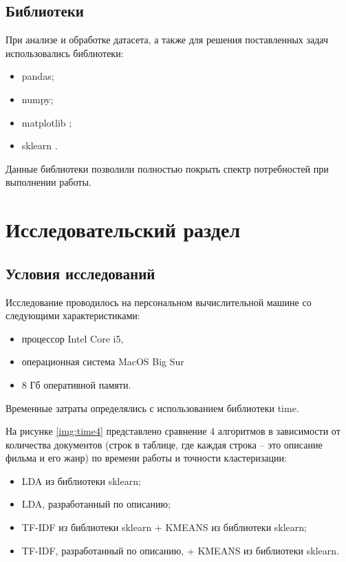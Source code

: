 \documentclass[12pt]{report}
\begin{document}
\section{Библиотеки}

При анализе и обработке датасета, а также для решения поставленных задач использовались библиотеки:
\begin{itemize}
	\item pandas;
	\item numpy;
	\item matplotlib \cite{matplotlib};
	\item sklearn \cite{sklearn}.
\end{itemize}

Данные библиотеки позволили полностью покрыть спектр потребностей при выполнении работы.


\chapter{Исследовательский раздел}
\section{Условия исследований}
Исследование проводилось на персональном вычислительной машине со следующими характеристиками:

\begin{itemize}
\item процессор Intel Core i5,
\item операционная система MacOS Big Sur
\item 8 Гб оперативной памяти.
\end{itemize}

Временные затраты определялись с использованием библиотеки time.

На рисунке \ref{img:time4} представлено сравнение 4 алгоритмов в зависимости от количества документов (строк в таблице, где каждая строка -- это описание фильма и его жанр) по времени работы и точности кластеризации:
\begin{itemize}
    \item LDA из библиотеки sklearn;
    \item LDA, разработанный по описанию;
    \item TF-IDF из библиотеки sklearn + KMEANS из библиотеки sklearn;
    \item TF-IDF, разработанный по описанию, + KMEANS из библиотеки sklearn.
\end{itemize}
\end{document}
